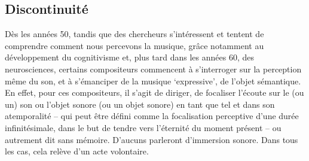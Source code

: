 \documentclass{article}
\begin{document}


\subsection{Discontinuité}


Dès les années 50, tandis que des chercheurs s'intéressent et tentent de comprendre comment nous percevons la musique, grâce notamment au développement du cognitivisme et, plus tard dans les années 60, des neurosciences, certains compositeurs commencent à s'interroger sur la perception même du son, et à s'émanciper de la musique `expressive', de l'objet sémantique. En effet, pour ces compositeurs, il s'agit de diriger, de focaliser l'écoute sur le (ou un) son ou l'objet sonore (ou un objet sonore) en tant que tel et dans son atemporalité -- qui peut être défini comme la focalisation perceptive d'une durée infinitésimale, dans le but de tendre vers l'éternité du moment présent -- ou autrement dit sans mémoire. D'aucuns parleront d'immersion sonore. Dans tous les cas, cela relève d'un acte volontaire.

%
%
%
\end{document}
